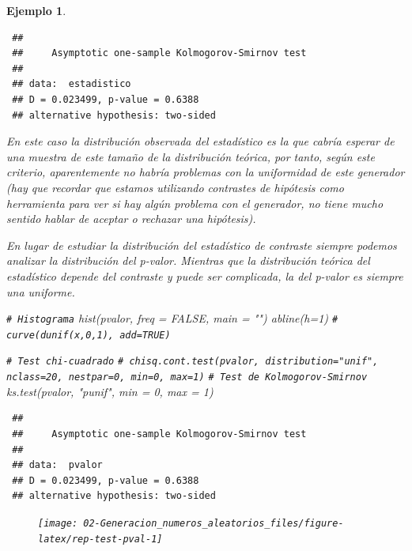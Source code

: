 \documentclass[
]{book}
\newenvironment{Shaded}{\begin{snugshade}}{\end{snugshade}}
\newcommand{\AttributeTok}[1]{\textcolor[rgb]{0.77,0.63,0.00}{#1}}
\newcommand{\CommentTok}[1]{\textcolor[rgb]{0.56,0.35,0.01}{\textit{#1}}}
\newcommand{\ConstantTok}[1]{\textcolor[rgb]{0.00,0.00,0.00}{#1}}
\newcommand{\DecValTok}[1]{\textcolor[rgb]{0.00,0.00,0.81}{#1}}
\newcommand{\FunctionTok}[1]{\textcolor[rgb]{0.00,0.00,0.00}{#1}}
\newcommand{\NormalTok}[1]{#1}
\newcommand{\StringTok}[1]{\textcolor[rgb]{0.31,0.60,0.02}{#1}}
\theoremstyle{break}
\newtheorem{example}{Ejemplo}[chapter]
\theoremstyle{nonumberplain}
\renewcommand{\CommentTok}[1]{\textcolor[rgb]{0.41,0.41,0.41}{\texttt{#1}}}
\begin{document}
\begin{example}
\begin{verbatim}
 ## 
 ##     Asymptotic one-sample Kolmogorov-Smirnov test
 ## 
 ## data:  estadistico
 ## D = 0.023499, p-value = 0.6388
 ## alternative hypothesis: two-sided
\end{verbatim}

En este caso la distribución observada del estadístico es la que cabría esperar de una muestra de este tamaño de la distribución teórica, por tanto, según este criterio, aparentemente no habría problemas con la uniformidad de este generador (hay que recordar que estamos utilizando contrastes de hipótesis como herramienta para ver si hay algún problema con el generador, no tiene mucho sentido hablar de aceptar o rechazar una hipótesis).

En lugar de estudiar la distribución del estadístico de contraste siempre podemos analizar la distribución del p-valor.
Mientras que la distribución teórica del estadístico depende del contraste y puede ser complicada, la del p-valor es siempre una uniforme.

\begin{Shaded}
\begin{Highlighting}[]
\CommentTok{\# Histograma}
\FunctionTok{hist}\NormalTok{(pvalor, }\AttributeTok{freq =} \ConstantTok{FALSE}\NormalTok{, }\AttributeTok{main =} \StringTok{""}\NormalTok{)}
\FunctionTok{abline}\NormalTok{(}\AttributeTok{h=}\DecValTok{1}\NormalTok{) }\CommentTok{\# curve(dunif(x,0,1), add=TRUE)}

\CommentTok{\# Test chi{-}cuadrado}
\CommentTok{\# chisq.cont.test(pvalor, distribution="unif", nclass=20, nestpar=0, min=0, max=1)}
\CommentTok{\# Test de Kolmogorov{-}Smirnov}
\FunctionTok{ks.test}\NormalTok{(pvalor, }\StringTok{"punif"}\NormalTok{,  }\AttributeTok{min =} \DecValTok{0}\NormalTok{, }\AttributeTok{max =} \DecValTok{1}\NormalTok{)}
\end{Highlighting}
\end{Shaded}

\begin{verbatim}
 ## 
 ##     Asymptotic one-sample Kolmogorov-Smirnov test
 ## 
 ## data:  pvalor
 ## D = 0.023499, p-value = 0.6388
 ## alternative hypothesis: two-sided
\end{verbatim}

\begin{figure}[!htb]

{\centering \texttt{[image: 02-Generacion\_numeros\_aleatorios\_files/figure-latex/rep-test-pval-1]} 

}
\end{figure}
\end{example}
\end{document}
